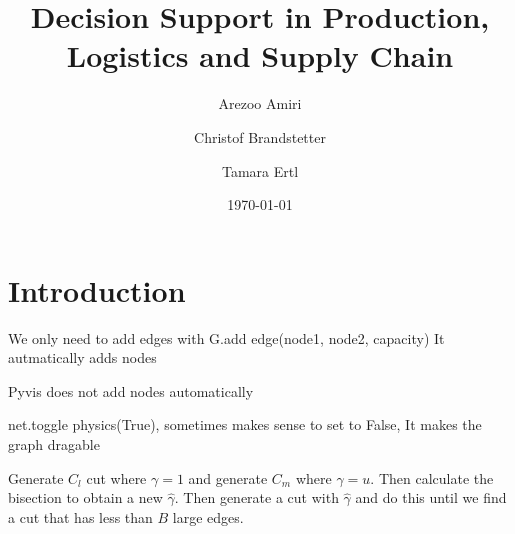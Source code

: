 \documentclass{article}
\title{Decision Support in Production, Logistics and Supply Chain}
\author{Arezoo Amiri \and Christof Brandstetter \and Tamara Ertl}
\date{\today}
\begin{document}
\maketitle

\section{Introduction}
We only need to add edges with G.add edge(node1, node2, capacity)
It autmatically adds nodes

Pyvis does not add nodes automatically

net.toggle physics(True), sometimes makes sense to set to False, It makes the graph dragable

Generate $C_l$ cut where $\gamma = 1$ and generate $C_m$ where $\gamma = u$.
Then calculate the bisection to obtain a new $\hat{\gamma}$. 
Then generate a cut with $\hat{\gamma}$ and do this until we find a cut that has less than $B$ large edges.

\end{document}
